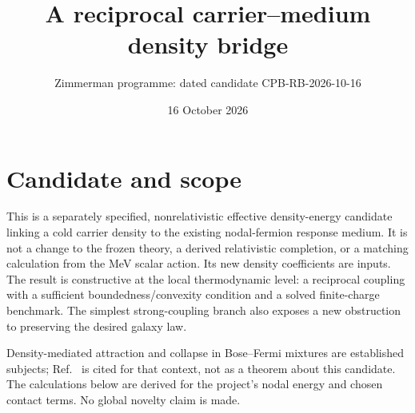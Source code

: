 \documentclass[11pt]{article}
\title{A reciprocal carrier--medium density bridge}
\author{Zimmerman programme: dated candidate CPB-RB-2026-10-16}
\date{16 October 2026}
\begin{document}
\maketitle
\section{Candidate and scope}
This is a separately specified, nonrelativistic effective density-energy
candidate linking a cold carrier density to the existing nodal-fermion
response medium. It is not a change to the frozen theory, a derived
relativistic completion, or a matching calculation from the MeV scalar
action. Its new density coefficients are inputs. The result is constructive
at the local thermodynamic level: a reciprocal coupling with a sufficient
boundedness/convexity condition and a solved finite-charge benchmark.
The simplest strong-coupling branch also exposes a new obstruction to
preserving the desired galaxy law.

Density-mediated attraction and collapse in Bose--Fermi mixtures are
established subjects; Ref.~\cite{rb:mixture} is cited for that context,
not as a theorem about this candidate. The calculations below are derived
for the project's nodal energy and chosen contact terms. No global novelty
claim is made.
\end{document}
